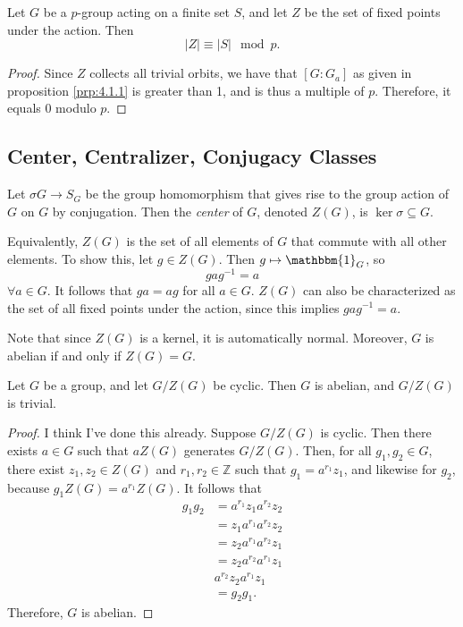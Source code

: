\begin{corollary}\label{cor:4.1.1}
	Let $G$ be a $p$-group acting on a finite set $S$, and let $Z$ be the set of fixed points under the action. Then
	\[
		\left| Z \right| \equiv \left| S \right| \mod{p}
	.\]
\end{corollary}
\begin{proof}
	Since $Z$ collects all trivial orbits, we have that $[G : G_a]$ as given in proposition \ref{prp:4.1.1} is greater than 1, and is thus a multiple of $p$. Therefore, it equals 0 modulo $p$.
\end{proof}

\subsection{Center, Centralizer, Conjugacy Classes}
\begin{definition}[Center]\label{dfn:4.1.2}
	Let $\sigma G \to S_G$ be the group homomorphism that gives rise to the group action of $G$ on $G$ by conjugation. Then the \emph{center} of $G$, denoted $Z(G)$, is $\ker \sigma \subseteq G$.
\end{definition}
Equivalently, $Z(G)$ is the set of all elements of $G$ that commute with all other elements. To show this, let $g\in Z(G)$. Then $g\mapsto \mathbbm{1}_{G} $, so
\[
gag^{-1} =a
\]
$\forall a\in G$. It follows that $ga=ag$ for all $a\in G$. $Z(G)$ can also be characterized as the set of all fixed points under the action, since this implies $gag^{-1} =a$.

Note that since $Z(G)$ is a kernel, it is automatically normal. Moreover, $G$ is abelian if and only if $Z(G)=G$.
\begin{lemma}\label{lma:4.1.1}
	Let $G$ be a group, and let $G/Z(G)$ be cyclic. Then $G$ is abelian, and $G/Z(G)$ is trivial.
\end{lemma}
\begin{proof}
	I think I've done this already. Suppose $G/Z(G)$ is cyclic. Then there exists $a\in G$ such that $aZ(G)$ generates $G/Z(G)$. Then, for all $g_1,g_2\in G$, there exist $z_1,z_2\in Z(G)$ and $r_1,r_2\in\mathbb{Z} $ such that $g_1=a^{r_1} z_1$, and likewise for $g_2$, because $g_1Z(G)=a^{r_1} Z(G)$. It follows that
	\begin{align*}
		g_1g_2&=a^{r_1} z_1a^{r_2} z_2\\
		      &=z_1a^{r_1} a^{r_2} z_2\\
		      &=z_2a^{r_1} a^{r_2} z_1\\
		      &=z_2a^{r_2} a^{r_1} z_1\\
		      &a^{r_2} z_2a^{r_1} z_1\\
		      &=g_2g_1
	.\end{align*}
	Therefore, $G$ is abelian.
\end{proof}

